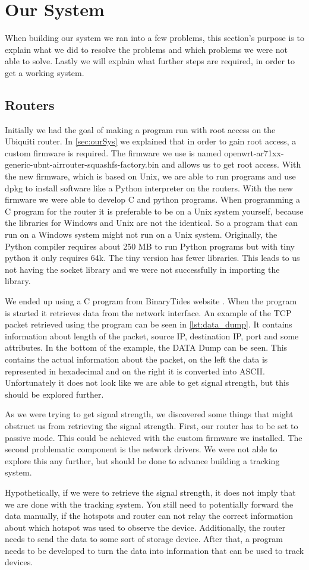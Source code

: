 \section{Our System}
When building our system we ran into a few problems, this section's purpose is to explain what we did to resolve the problems and which problems we were not able to solve. Lastly we will explain what further steps are required, in order to get a working system.

\subsection*{Routers}
Initially we had the goal of making a program run with root access on the Ubiquiti router. In \cref{sec:ourSys} we explained that in order to gain root access, a custom firmware is required. The firmware we use is named openwrt-ar71xx-generic-ubnt-airrouter-squashfs-factory.bin and allows us to get root access. With the new firmware, which is based on Unix, we are able to run programs and use dpkg to install software like a Python interpreter on the routers. With the new firmware we were able to develop C and python programs. When programming a C program for the router it is preferable to be on a Unix system yourself, because the libraries for Windows and Unix are not the identical. So a program that can run on a Windows system might not run on a Unix system. Originally, the Python compiler requires about 250 MB to run Python programs but with tiny python it only requires 64k. The tiny version has fewer libraries. This leads to us not having the socket library and we were not successfully in importing the library.

We ended up using a C program from BinaryTides website \cite{SnifferCode}. When the program is started it retrieves data from the network interface. An example of the TCP packet retrieved using the program can be seen in \cref{lst:data_dump}. It contains information about length of the packet, source IP, destination IP, port and some attributes. In the bottom of the example, the DATA Dump can be seen. This contains the actual information about the packet, on the left the data is represented in hexadecimal and on the right it is converted into ASCII. Unfortunately it does not look like we are able to get signal strength, but this should be explored further.

As we were trying to get signal strength, we discovered some things that might obstruct us from retrieving the signal strength. First, our router has to be set to passive mode. This could be achieved with the custom firmware we installed. The second problematic component is the network drivers. We were not able to explore this any further, but should be done to advance building a tracking system.

Hypothetically, if we were to retrieve the signal strength, it does not imply that we are done with the tracking system. You still need to potentially forward the data manually, if the hotspots and router can not relay the correct information about which hotspot was used to observe the device. Additionally, the router needs to send the data to some sort of storage device. After that, a program needs to be developed to turn the data into information that can be used to track devices.
